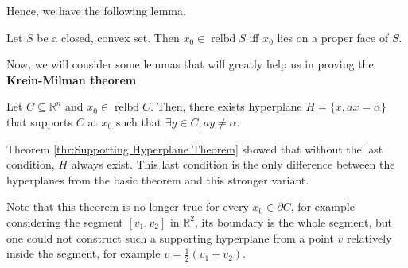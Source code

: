 Hence, we have the following lemma.

\begin{lemma}
\label{lem:Points on relative boundary lies on a proper face}
  Let \( S \) be a closed, convex set. Then \( x_{0} \in \operatorname{relbd}
 S \) iff \( x_{0} \) lies on a proper face of \( S \).
\end{lemma}

Now, we will consider some lemmas that will greatly help us in proving the
\textbf{Krein-Milman theorem}.

  \begin{lemma}
  \label{lem:Supporting Hyperplane Theorem (Stronger variant)}

  Let \( C \subseteq \mathbb{R}^{n} \) and \( x_{0} \in \operatorname{relbd} C \).
  Then, there exists hyperplane \( H = \{x, ax = \alpha\}   \) that supports \(
  C\) at \( x_{0} \) such that \( \exists y \in C, ay \neq  \alpha \).
  \end{lemma}

  Theorem \ref{thr:Supporting Hyperplane Theorem} showed that without the last
  condition, \( H \) always exist. This last condition is the only difference
  between the hyperplanes from the basic theorem and this stronger variant.

  Note that this theorem is no longer true for every \( x_{0} \in \partial C \),
  for example considering the segment \( [v_{1}, v_{2}] \) in \( \mathbb{R}^2
  \), its boundary is the whole segment, but one could not construct such a
  supporting hyperplane from a point \( v \) relatively inside the segment, for
  example \( v = \frac{1}{2}(v_{1} + v_{2}) \).

